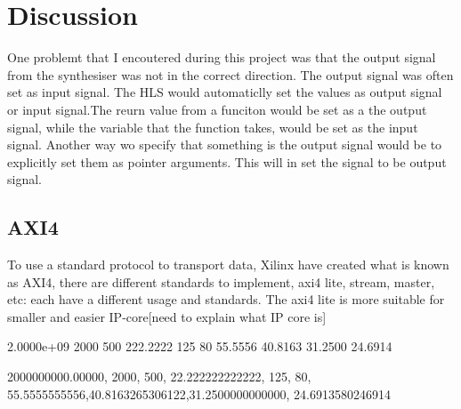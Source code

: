 \chapter{Discussion} \label{discussion}

One problemt that I encoutered during this project was that the output signal from the synthesiser was not in the correct direction. The output signal was often set as input signal. The HLS would automaticlly set the values as output signal or input signal.The reurn value from a funciton would be set as a the output signal, while the variable that the function takes, would be set as the input signal. Another way wo specify that something is the output signal would be to explicitly set them as pointer arguments. This will in set the signal to be output signal.

\section{AXI4}
To use a standard protocol to transport data, Xilinx have created what is known as AXI4, there are different standards to implement, axi4 lite, stream, master, etc: each have a different usage and standards. The axi4 lite is more suitable for smaller and easier IP-core[need to explain what IP core is]


2.0000e+09	2000	500	222.2222	125	80	55.5556	40.8163	31.2500	24.6914

2000000000.00000, 2000, 500, 22.222222222222, 125, 80, 55.5555555556,40.8163265306122,31.2500000000000, 24.6913580246914